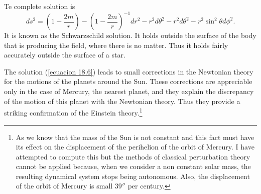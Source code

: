 Te complete solution is
\begin{equation}
\label{ecuacion 18.6}
 ds^2 = \left( 1 - \frac{2 m }{r} \right)
 -  \left( 1 - \frac{2 m }{r} \right)^{-1} dr^2 - r^2 d\theta^2 - r^2 d\theta^2 - r^2 \sin^2 \theta d\phi^2.
\end{equation}
It is known as the Schwarzschild solution. It holds outside the surface of the body that is producing the field, where 
there is no matter. Thus it holds fairly accurately outside the surface of a star.

The solution (\ref{ecuacion 18.6}) leads to small corrections in the Newtonian theory for the motions of the planets 
around the Sun. These corrections are appreciable only in the case of Mercury, the nearest planet, and they explain the 
discrepancy of the motion of this planet with the Newtonian theory. Thus they provide a striking confirmation of the 
Einstein theory.\footnote{As we know that the mass of the Sun is not constant and this fact must have its effect on the 
displacement of the perihelion of the orbit of Mercury. I have attempted to compute this but the methods of classical 
perturbation theory cannot be applied because, when we consider a non constant solar mass, the resulting dynamical 
system stops being autonomous. Also, the displacement of the orbit of Mercury is small $39''$ per century. } 






